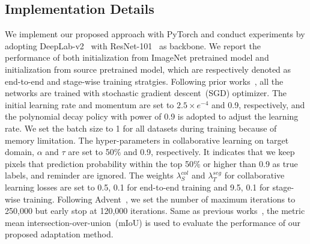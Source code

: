 \documentclass[final]{cvpr}
\begin{document}
\subsection{Implementation Details}
We implement our proposed approach with PyTorch and conduct experiments by adopting DeepLab-v2~\cite{chen2017deeplab} with ResNet-101~\cite{he2016deep} as backbone. We report the performance of both initialization from ImageNet pretrained model and initialization from source pretrained model, which are respectively denoted as end-to-end and stage-wise training stratgies. Following prior works~\cite{FDA_Yang_2020_CVPR,vu2019advent,tsai2018learning}, all the networks are trained with stochastic gradient descent~(SGD) optimizer. The initial learning rate and momentum are set to $2.5\times e^{-4}$ and 0.9, respectively, and the polynomial decay policy with power of 0.9 is adopted to adjust the learning rate. We set the batch size to 1 for all datasets during training because of memory limitation. The hyper-parameters in collaborative learning on target domain, $\alpha$ and $\tau$ are set to 50\% and 0.9, respectively. It indicates that we keep pixels that prediction probability within the top 50\% or higher than 0.9 as true labels, and reminder are ignored. The weights $\lambda_S^{col}$ and $\lambda_T^{seg}$ for collaborative learning losses are set to 0.5, 0.1 for end-to-end training and 9.5, 0.1 for stage-wise training. Following Advent~\cite{vu2019advent}, we set the number of maximum iterations to 250,000 but early stop at 120,000 iterations. Same as previous works~\cite{FDA_Yang_2020_CVPR,vu2019advent,tsai2018learning,pan2020unsupervised}, the metric mean intersection-over-union~(mIoU) is used to evaluate the performance of our proposed adaptation method.
\end{document}
